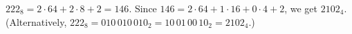 $222_8=2\cdot64+2\cdot8+2=146$. Since $146=2\cdot64+1\cdot16+0\cdot4+2$, we get $\boxed{2102_4}$. (Alternatively, $222_8=010\,010\,010_2=10\,01\,00\,10_2=2102_4$.)
